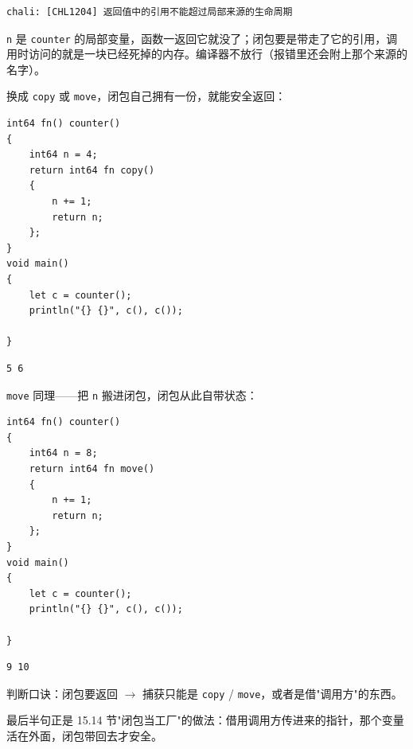\par
\medskip
\begin{lstlisting}[style=out]
chali: [CHL1204] 返回值中的引用不能超过局部来源的生命周期
\end{lstlisting}
\par
\medskip

\texttt{n} 是 \texttt{counter} 的局部变量，函数一返回它就没了；闭包要是带走了它的引用，调用时访问的就是一块已经死掉的内存。编译器不放行（报错里还会附上那个来源的名字）。

换成 \texttt{copy} 或 \texttt{move}，闭包自己拥有一份，就能安全返回：

\par
\medskip
\begin{lstlisting}[style=chali]
int64 fn() counter()
{
    int64 n = 4;
    return int64 fn copy()
    {
        n += 1;
        return n;
    };
}
void main()
{
    let c = counter();
    println("{} {}", c(), c());

}
\end{lstlisting}
\par
\medskip

\par
\medskip
\begin{lstlisting}[style=out]
5 6
\end{lstlisting}
\par
\medskip

\texttt{move} 同理——把 \texttt{n} 搬进闭包，闭包从此自带状态：

\par
\medskip
\begin{lstlisting}[style=chali]
int64 fn() counter()
{
    int64 n = 8;
    return int64 fn move()
    {
        n += 1;
        return n;
    };
}
void main()
{
    let c = counter();
    println("{} {}", c(), c());

}
\end{lstlisting}
\par
\medskip

\par
\medskip
\begin{lstlisting}[style=out]
9 10
\end{lstlisting}
\par
\medskip

判断口诀：闭包要返回 \ensuremath{\rightarrow} 捕获只能是 \texttt{copy} / \texttt{move}，或者是借"调用方"的东西。

最后半句正是 15.14 节"闭包当工厂"的做法：借用调用方传进来的指针，那个变量活在外面，闭包带回去才安全。

